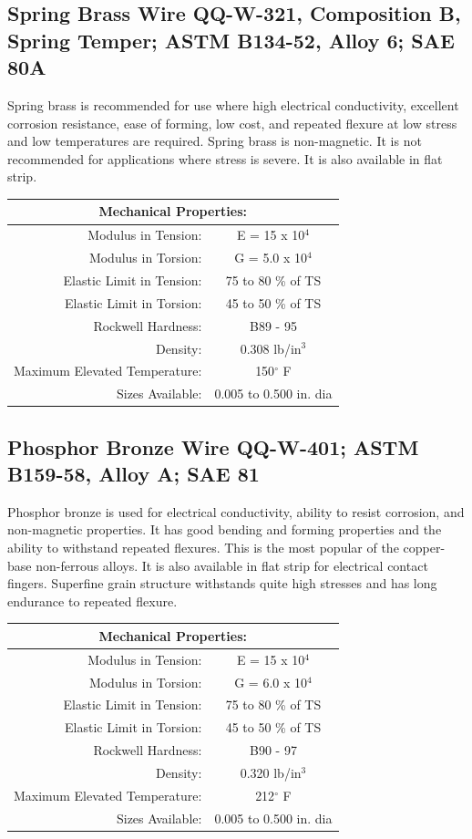 \documentclass[10pt]{article}
\begin{document}
\subsection{Spring Brass Wire QQ-W-321, Composition B, Spring Temper; ASTM B134-52, Alloy 6; SAE 80A} %
Spring brass is recommended for use where high electrical conductivity, excellent corrosion resistance, ease of forming, low cost, and repeated flexure at low stress and low temperatures are required.
Spring brass is non-magnetic.
It is not recommended for applications where stress is severe. 
It is also available in flat strip.
\begin{center}
\begin{tabular}{ r c }
\multicolumn{2}{c}{Mechanical Properties:} \\
\hline
Modulus in Tension: & E = 15 x 10$^4$ \\  
Modulus in Torsion: & G = 5.0 x 10$^4$ \\
Elastic Limit in Tension: & 75 to 80 \% of TS \\  
Elastic Limit in Torsion: & 45 to 50 \% of TS \\
Rockwell Hardness: & B89 - 95 \\
Density: & 0.308 lb/in$^3$ \\
Maximum Elevated Temperature: & 150$^\circ$ F \\
Sizes Available: & 0.005 to 0.500 in. dia \\
\hline
\end{tabular}
\end{center}

\subsection{Phosphor Bronze Wire QQ-W-401; ASTM B159-58, Alloy A; SAE 81} %
Phosphor bronze is used for electrical conductivity, ability to resist corrosion, and non-magnetic properties.
It has good bending and forming properties and the ability to withstand repeated flexures.
This is the most popular of the copper-base non-ferrous alloys.
It is also available in flat strip for electrical contact fingers.
Superfine grain structure withstands quite high stresses and has long endurance to repeated flexure.
\begin{center}
\begin{tabular}{ r c }
\multicolumn{2}{c}{Mechanical Properties:} \\
\hline
Modulus in Tension: & E = 15 x 10$^4$ \\  
Modulus in Torsion: & G = 6.0 x 10$^4$ \\
Elastic Limit in Tension: & 75 to 80 \% of TS \\  
Elastic Limit in Torsion: & 45 to 50 \% of TS \\
Rockwell Hardness: & B90 - 97 \\
Density: & 0.320 lb/in$^3$ \\
Maximum Elevated Temperature: & 212$^\circ$ F \\
Sizes Available: & 0.005 to 0.500 in. dia \\
\hline
\end{tabular}
\end{center}
\end{document}
